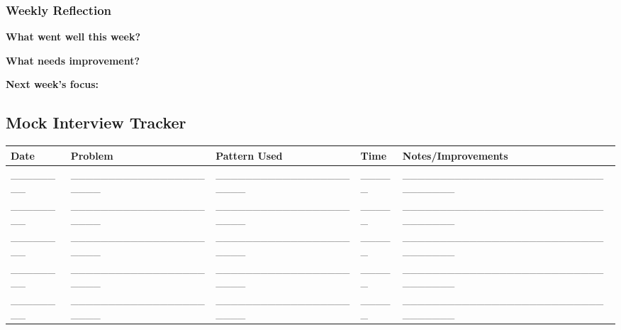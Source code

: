 \documentclass[10pt,a4paper]{article}
\begin{document}
\subsubsection{Weekly Reflection}
\textbf{What went well this week?}\\

\textbf{What needs improvement?}\\

\textbf{Next week's focus:}\\

\newpage

\subsection{Mock Interview Tracker}

\begin{table}[h]
\centering
\begin{tabular}{|p{2cm}|p{3cm}|p{4cm}|p{2cm}|p{3cm}|}
\hline
\textbf{Date} & \textbf{Problem} & \textbf{Pattern Used} & \textbf{Time} & \textbf{Notes/Improvements} \\
\hline
\_\_\_\_\_\_\_\_ & \_\_\_\_\_\_\_\_\_\_\_\_\_\_\_\_\_\_\_\_\_\_ & \_\_\_\_\_\_\_\_\_\_\_\_\_\_\_\_\_\_\_\_\_\_ & \_\_\_\_\_ & \_\_\_\_\_\_\_\_\_\_\_\_\_\_\_\_\_\_\_\_\_\_\_\_\_\_\_\_\_\_\_\_\_\_ \\
\hline
\_\_\_\_\_\_\_\_ & \_\_\_\_\_\_\_\_\_\_\_\_\_\_\_\_\_\_\_\_\_\_ & \_\_\_\_\_\_\_\_\_\_\_\_\_\_\_\_\_\_\_\_\_\_ & \_\_\_\_\_ & \_\_\_\_\_\_\_\_\_\_\_\_\_\_\_\_\_\_\_\_\_\_\_\_\_\_\_\_\_\_\_\_\_\_ \\
\hline
\_\_\_\_\_\_\_\_ & \_\_\_\_\_\_\_\_\_\_\_\_\_\_\_\_\_\_\_\_\_\_ & \_\_\_\_\_\_\_\_\_\_\_\_\_\_\_\_\_\_\_\_\_\_ & \_\_\_\_\_ & \_\_\_\_\_\_\_\_\_\_\_\_\_\_\_\_\_\_\_\_\_\_\_\_\_\_\_\_\_\_\_\_\_\_ \\
\hline
\_\_\_\_\_\_\_\_ & \_\_\_\_\_\_\_\_\_\_\_\_\_\_\_\_\_\_\_\_\_\_ & \_\_\_\_\_\_\_\_\_\_\_\_\_\_\_\_\_\_\_\_\_\_ & \_\_\_\_\_ & \_\_\_\_\_\_\_\_\_\_\_\_\_\_\_\_\_\_\_\_\_\_\_\_\_\_\_\_\_\_\_\_\_\_ \\
\hline
\_\_\_\_\_\_\_\_ & \_\_\_\_\_\_\_\_\_\_\_\_\_\_\_\_\_\_\_\_\_\_ & \_\_\_\_\_\_\_\_\_\_\_\_\_\_\_\_\_\_\_\_\_\_ & \_\_\_\_\_ & \_\_\_\_\_\_\_\_\_\_\_\_\_\_\_\_\_\_\_\_\_\_\_\_\_\_\_\_\_\_\_\_\_\_ \\
\hline
\end{tabular}
\end{table}
\end{document}
